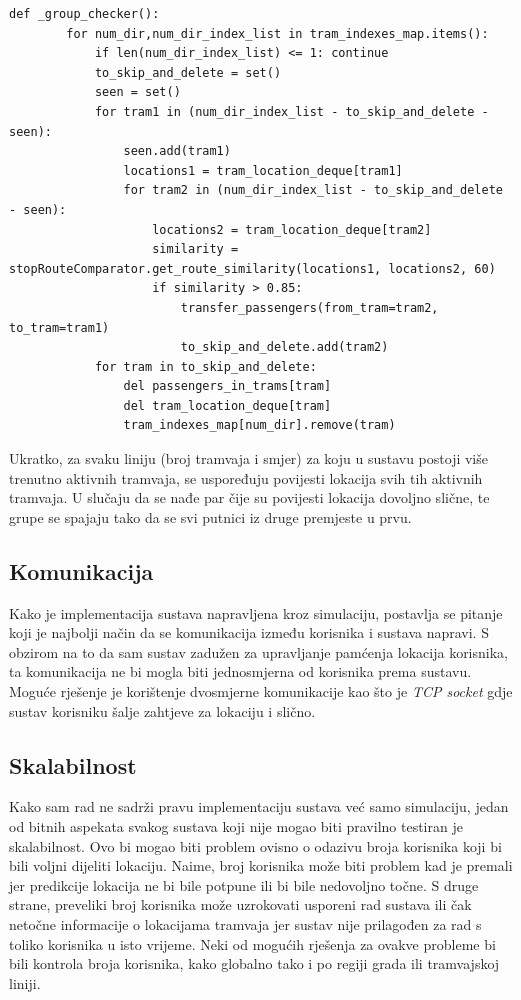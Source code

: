 \documentclass[times, utf8, diplomski]{fer}
\begin{document}
\begin{lstlisting}[caption={Provjera nepostojećih grupa},captionpos=b,label={kod:group_check}]
    def _group_checker():
        for num_dir,num_dir_index_list in tram_indexes_map.items():
            if len(num_dir_index_list) <= 1: continue
            to_skip_and_delete = set()
            seen = set()
            for tram1 in (num_dir_index_list - to_skip_and_delete - seen):
                seen.add(tram1)
                locations1 = tram_location_deque[tram1]
                for tram2 in (num_dir_index_list - to_skip_and_delete - seen):
                    locations2 = tram_location_deque[tram2]
                    similarity = stopRouteComparator.get_route_similarity(locations1, locations2, 60)
                    if similarity > 0.85:
                        transfer_passengers(from_tram=tram2, to_tram=tram1)
                        to_skip_and_delete.add(tram2)
            for tram in to_skip_and_delete:
                del passengers_in_trams[tram]
                del tram_location_deque[tram]
                tram_indexes_map[num_dir].remove(tram)

\end{lstlisting}

Ukratko, za svaku liniju (broj tramvaja i smjer) za koju u sustavu postoji više trenutno aktivnih tramvaja, se uspoređuju povijesti lokacija svih tih aktivnih tramvaja. U slučaju da se nađe par čije su povijesti lokacija dovoljno slične, te grupe se spajaju tako da se svi putnici iz druge premjeste u prvu.


\subsection{Komunikacija}
Kako je implementacija sustava napravljena kroz simulaciju, postavlja se pitanje koji je najbolji način da se komunikacija između korisnika i sustava napravi. S obzirom na to da sam sustav zadužen za upravljanje pamćenja lokacija korisnika, ta komunikacija ne bi mogla biti jednosmjerna od korisnika prema sustavu. Moguće rješenje je korištenje dvosmjerne komunikacije kao što je \emph{TCP socket} gdje sustav korisniku šalje zahtjeve za lokaciju i slično.

\subsection{Skalabilnost}
Kako sam rad ne sadrži pravu implementaciju sustava već samo simulaciju, jedan od bitnih aspekata svakog sustava koji nije mogao biti pravilno testiran je skalabilnost.
Ovo bi mogao biti problem ovisno o odazivu broja korisnika koji bi bili voljni dijeliti lokaciju.
Naime, broj korisnika može biti problem kad je premali jer predikcije lokacija ne bi bile potpune ili bi bile nedovoljno točne. S druge strane, preveliki broj korisnika može uzrokovati usporeni rad sustava ili čak netočne informacije o lokacijama tramvaja jer sustav nije prilagođen za rad s toliko korisnika u isto vrijeme. 
Neki od mogućih rješenja za ovakve probleme bi bili kontrola broja korisnika, kako globalno tako i po regiji grada ili tramvajskoj liniji.
\end{document}

